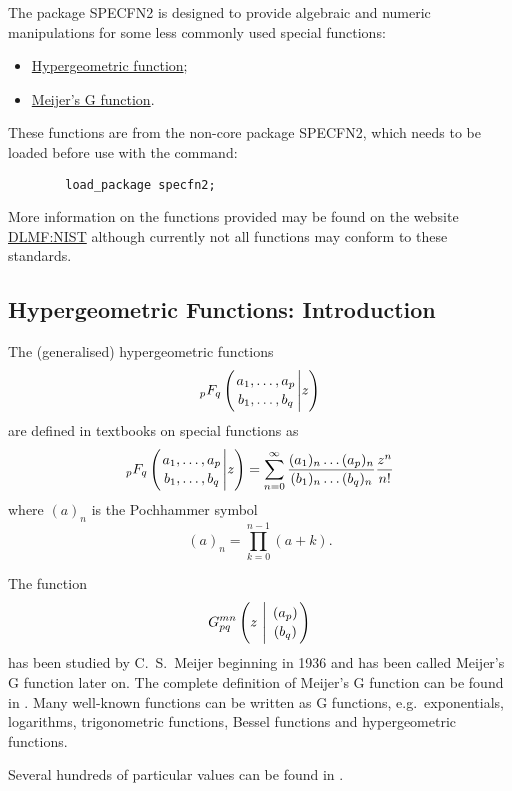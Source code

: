 

\hypertarget{SPECFNS2}{}

The package SPECFN2 is designed to provide algebraic and numeric manipulations
for some less commonly used special functions:
\begin{itemize}
\item \hyperlink{operator:HYPERGEOMETRIC}{Hypergeometric function};
\item \hyperlink{operator:MEIJERG}{Meijer's G function}.
\end{itemize}

These functions are from the non-core package SPECFN2, which
needs to be loaded before use with the command:
\begin{verbatim}
        load_package specfn2;
\end{verbatim}

More information on the functions provided may be found on the website
\href{https://dlmf.nist.gov/}{DLMF:NIST} although currently not all functions
may conform to these standards.

\subsection{Hypergeometric Functions: Introduction}
The (generalised) hypergeometric functions
\[
_pF_q \left( \genfrac{}{}{0pt}{}{a_1, \ldots , a_p}{b_1, \ldots ,b_q} \Bigg\vert z \right)
\]
are defined in textbooks on special functions as
\[
_pF_q \left( \genfrac{}{}{0pt}{}{a_1, \ldots , a_p}{b_1, \ldots ,b_q} \Bigg\vert z \right)
  = \sum_{n=0}^{\infty}\frac{(a_{1})_{n}\dots(a_{p})_{n}}{(b_{1})_{n}\dots(b_{q})_{n}}\frac{z^{n}}{n!}
\]
where $(a)_{n}$ is the Pochhammer symbol
\[
 (a)_{n} = \prod_{k=0}^{n-1} (a+k).
\]

The function 
\[
G_{p q}^{m n} \left( z \  \Bigg\vert \  \genfrac{}{}{0pt}{}{(a_p)}{(b_q)} \right)
\]
has been studied by C.~S.~Meijer beginning in 1936 and has been
called Meijer's G function later on. The complete definition of Meijer's
G function can be found in \cite{Prudnikov:90c}.
Many well-known functions can be written as G functions,
e.g.\ exponentials, logarithms, trigonometric functions, Bessel functions
and hypergeometric functions.

Several hundreds of particular values can be found in \cite{Prudnikov:90c}.

